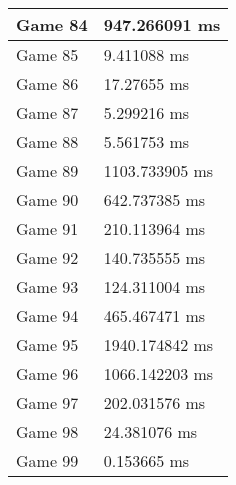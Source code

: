 \begin{tabular}{|l|l|}
	Game 84 & 947.266091 ms \\ \hline
	Game 85 & 9.411088 ms \\ \hline
	Game 86 & 17.27655 ms \\ \hline
	Game 87 & 5.299216 ms \\ \hline
	Game 88 & 5.561753 ms \\ \hline
	Game 89 & 1103.733905 ms \\ \hline
	Game 90 & 642.737385 ms \\ \hline
	Game 91 & 210.113964 ms \\ \hline
	Game 92 & 140.735555 ms \\ \hline
	Game 93 & 124.311004 ms \\ \hline
	Game 94 & 465.467471 ms \\ \hline
	Game 95 & 1940.174842 ms \\ \hline
	Game 96 & 1066.142203 ms \\ \hline
	Game 97 & 202.031576 ms \\ \hline
	Game 98 & 24.381076 ms \\ \hline
	Game 99 & 0.153665 ms \\ \hline
\end{tabular}
